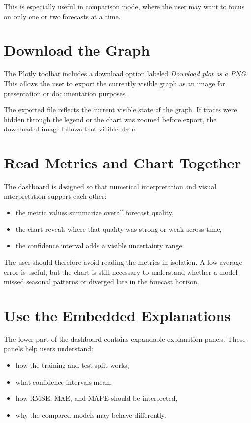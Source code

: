 This is especially useful in comparison mode, where the user may want to focus on only one or two forecasts at a time.

\section{Download the Graph}

The Plotly toolbar includes a download option labeled \textit{Download plot as a PNG}. This allows the user to export the currently visible graph as an image for presentation or documentation purposes.

The exported file reflects the current visible state of the graph. If traces were hidden through the legend or the chart was zoomed before export, the downloaded image follows that visible state.

\section{Read Metrics and Chart Together}

The dashboard is designed so that numerical interpretation and visual interpretation support each other:

\begin{itemize}
    \item the metric values summarize overall forecast quality,
    \item the chart reveals where that quality was strong or weak across time,
    \item the confidence interval adds a visible uncertainty range.
\end{itemize}

The user should therefore avoid reading the metrics in isolation. A low average error is useful, but the chart is still necessary to understand whether a model missed seasonal patterns or diverged late in the forecast horizon.

\section{Use the Embedded Explanations}

The lower part of the dashboard contains expandable explanation panels. These panels help users understand:

\begin{itemize}
    \item how the training and test split works,
    \item what confidence intervals mean,
    \item how RMSE, MAE, and MAPE should be interpreted,
    \item why the compared models may behave differently.
\end{itemize}

